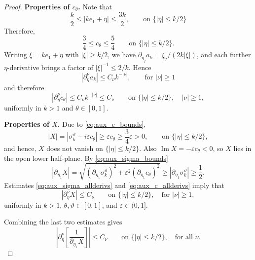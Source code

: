 \documentclass[10pt,a4paper]{amsart}
\begin{document}
\begin{proof}
\textbf{Properties of $c_\theta$.}
Note that 
\begin{equation*}
    \frac{k}{2}\leq |ke_1+\eta|\leq \frac{3k}{2},
    \qquad
    \text{on }
    \{|\eta|\leq k/2\}
\end{equation*}
Therefore, 
\begin{equation}\label{eq:aux_c_bounds}
  \frac{3}{4}\leq c_\theta\le\frac{5}{4}
  \qquad\text{on }\{|\eta|\leq k/2\}.
\end{equation}
Writing $\xi=ke_1+\eta$ with $|\xi|\geq k/2$, we have
$\partial_{\eta_j}a_k=\xi_j/(2k|\xi|)$, and each further $\eta$-derivative
brings a factor of $|\xi|^{-1}\leq 2/k$.
Hence
\begin{equation}\label{eq:aux_a_allderivs}
    |\partial_\eta^\nu a_k|\leq C_\nu k^{-|\nu|},
    \qquad
    \text{for }
    |\nu|\geq 1
\end{equation}
and therefore
\begin{equation}\label{eq:aux_c_allderivs}
  |\partial_\eta^\nu c_\theta|\leq C_\nu k^{-|\nu|}\leq C_\nu
  \qquad\text{on }\{|\eta|\leq k/2\},\quad|\nu|\geq 1,
\end{equation}
uniformly in $k> 1$ and $\theta\in[0,1]$.

\textbf{Properties of $X$.}
Due to \eqref{eq:aux_c_bounds},
\begin{equation}\label{eq:aux_Xnonzero}
  |X|= |\sigma_k^\vartheta-i\varepsilon c_\theta| \geq \varepsilon c_\theta\geq \frac{3}{4}\varepsilon>0,
  \qquad
  \text{on } \{|\eta|\leq k/2\},
\end{equation}
and hence, $X$ does not vanish on $\{|\eta|\leq k/2\}$.
Also $\operatorname{Im} X=-\varepsilon c_\theta<0$, so $X$ lies in the open
lower half-plane. By \eqref{eq:aux_sigma_bounds}
\begin{equation}\label{eq:aux_dX_lower}
    |\partial_{\eta_1}X|
    =\sqrt{(\partial_{\eta_1}\sigma_k^\vartheta)^2
    +\varepsilon^2(\partial_{\eta_1}c_\theta)^2}
    \geq |\partial_{\eta_1}\sigma_k^\vartheta|
    \geq\frac{1}{2}.
\end{equation}
Estimates \eqref{eq:aux_sigma_allderivs} and \eqref{eq:aux_c_allderivs} imply that
\begin{equation}\label{eq:aux_X_allderivs}
  |\partial_\eta^\nu X|\leq C_\nu
  \qquad\text{on }\{|\eta|\leq k/2\},\quad\text{for }|\nu|\geq 1,
\end{equation}
uniformly in $k> 1$, $\theta,\vartheta\in[0,1]$, and $\varepsilon\in(0,1]$.

Combining the last two estimates gives 
\begin{equation}\label{eq:aux_inv_dX_allderivs}
  \left|\partial_\eta^\nu\left[\frac{1}{\partial_{\eta_1}X}\right]\right|\leq C_\nu
  \qquad\text{on }\{|\eta|\leq k/2\},\quad\text{for all }\nu.
\end{equation}



\end{proof}
\end{document}
